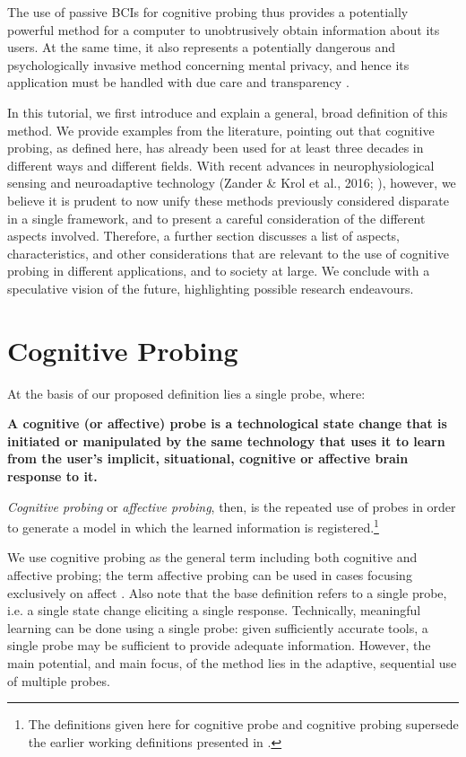 The use of passive BCIs for cognitive probing thus provides a potentially powerful method for a computer to unobtrusively obtain information about its users. At the same time, it also represents a potentially dangerous and psychologically invasive method concerning mental privacy, and hence its application must be handled with due care and transparency \cite{mecacci2019criteria}.

In this tutorial, we first introduce and explain a general, broad definition of this method. We provide examples from the literature, pointing out that cognitive probing, as defined here, has already been used for at least three decades in different ways and different fields. With recent advances in neurophysiological sensing \cite{mullen2015dry,zander2017dry} and neuroadaptive technology (Zander \& Krol et al., 2016; ), however, we believe it is prudent to now unify these methods previously considered disparate in a single framework, and to present a careful consideration of the different aspects involved. Therefore, a further section discusses a list of aspects, characteristics, and other considerations that are relevant to the use of cognitive probing in different applications, and to society at large. We conclude with a speculative vision of the future, highlighting possible research endeavours.


\section{Cognitive Probing}
\label{sec:definition}

At the basis of our proposed definition lies a single probe, where: \newline

\textbf{A cognitive (or affective) probe is a technological state change that is initiated or manipulated by the same technology that uses it to learn from the user's implicit, situational, cognitive or affective brain response to it.} \newline

\emph{Cognitive probing} or \emph{affective probing}, then, is the repeated use of probes in order to generate a model in which the learned information is registered.\footnote{The definitions given here for cognitive probe and cognitive probing supersede the earlier working definitions presented in .}

We use cognitive probing as the general term including both cognitive and affective probing; the term affective probing can be used in cases focusing exclusively on affect \cite{zander2009affective}. Also note that the base definition refers to a single probe, i.e. a single state change eliciting a single response. Technically, meaningful learning can be done using a single probe: given sufficiently accurate tools, a single probe may be sufficient to provide adequate information. However, the main potential, and main focus, of the method lies in the adaptive, sequential use of multiple probes.

